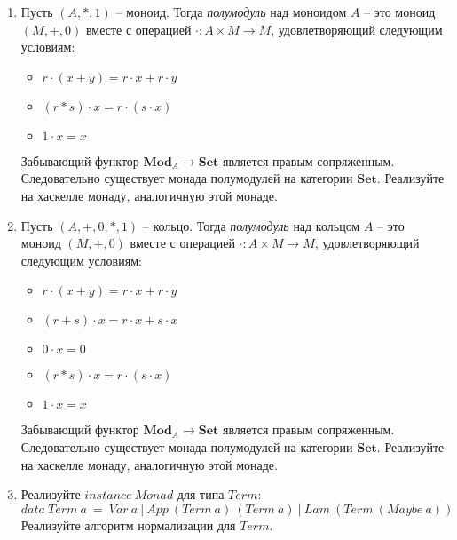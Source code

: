 \documentclass[draft]{article}
\newcommand{\cat}[1]{\mathbf{#1}}
\newcommand{\Set}{\cat{Set}}
\begin{document}
\begin{enumerate}
\item Пусть $(A,*,1)$ -- моноид.
Тогда \emph{полумодуль} над моноидом $A$ -- это моноид $(M,+,0)$ вместе с операцией $\cdot : A \times M \to M$, удовлетворяющий следующим условиям:
\begin{itemize}
\item $r \cdot (x + y) = r \cdot x + r \cdot y$
\item $(r * s) \cdot x = r \cdot (s \cdot x)$
\item $1 \cdot x = x$
\end{itemize}
Забывающий функтор $\cat{Mod}_A \to \Set$ является правым сопряженным.
Следовательно существует монада полумодулей на категории $\Set$.
Реализуйте на хаскелле монаду, аналогичную этой монаде.

\item Пусть $(A,+,0,*,1)$ -- кольцо.
Тогда \emph{полумодуль} над кольцом $A$ -- это моноид $(M,+,0)$ вместе с операцией $\cdot : A \times M \to M$, удовлетворяющий следующим условиям:
\begin{itemize}
\item $r \cdot (x + y) = r \cdot x + r \cdot y$
\item $(r + s) \cdot x = r \cdot x + s \cdot x$
\item $0 \cdot x = 0$
\item $(r * s) \cdot x = r \cdot (s \cdot x)$
\item $1 \cdot x = x$
\end{itemize}
Забывающий функтор $\cat{Mod}_A \to \Set$ является правым сопряженным.
Следовательно существует монада полумодулей на категории $\Set$.
Реализуйте на хаскелле монаду, аналогичную этой монаде.

\item Реализуйте $\mathit{instance}\ \mathit{Monad}$ для типа $\mathit{Term}$:
\[ \mathit{data}\ \mathit{Term}\ a\ =\ \mathit{Var}\ a\ |\ \mathit{App}\ (\mathit{Term}\ a)\ (\mathit{Term}\ a)\ |\ \mathit{Lam}\ (\mathit{Term}\ (\mathit{Maybe}\ a)) \]
Реализуйте алгоритм нормализации для $\mathit{Term}$.

\end{enumerate}
\end{document}
